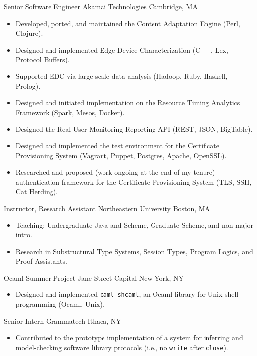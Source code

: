 \documentclass[10pt,letterpaper,sans]{moderncv}
\begin{document}
        {Senior Software Engineer}
        {Akamai Technologies}
        {Cambridge, MA}
        {}
        {%
          \begin{itemize}
          \item Developed, ported, and maintained the Content Adaptation Engine (Perl, Clojure).
          \item Designed and implemented Edge Device Characterization (C++, Lex, Protocol Buffers).
          \item Supported EDC via large-scale data analysis (Hadoop, Ruby, Haskell, Prolog).
          \item Designed and initiated implementation on the Resource Timing Analytics Framework
            (Spark, Mesos, Docker).
          \item Designed the Real User Monitoring Reporting API (REST, JSON, BigTable).
          \item Designed and implemented the test environment for the Certificate Provisioning
            System (Vagrant, Puppet, Postgres, Apache, OpenSSL).
          \item Researched and proposed (work ongoing at the end of my tenure) authentication
            framework for the Certificate Provisioning System (TLS, SSH, Cat Herding).
          \end{itemize}
        }

        {Instructor, Research Assistant}
        {Northeastern University}
        {Boston, MA}
        {}
        {%
          \begin{itemize}
          \item Teaching: Undergraduate Java and Scheme, Graduate Scheme, and non-major intro.
          \item Research in Substructural Type Systems, Session Types, Program Logics, and Proof
            Assistants.
          \end{itemize}
        }

        {Ocaml Summer Project}
        {Jane Street Capital}
        {New York, NY}
        {}
        {%
          \begin{itemize}
          \item Designed and implemented \texttt{caml-shcaml}, an Ocaml library for Unix shell
            programming (Ocaml, Unix).
          \end{itemize}
        }

        {Senior Intern}
        {Grammatech}
        {Ithaca, NY}
        {}
        {%
          \begin{itemize}
          \item Contributed to the prototype implementation of a system for inferring and
            model-checking software library protocols (i.e., no \texttt{write} after
            \texttt{close}).
          \end{itemize}
        }
\end{document}
